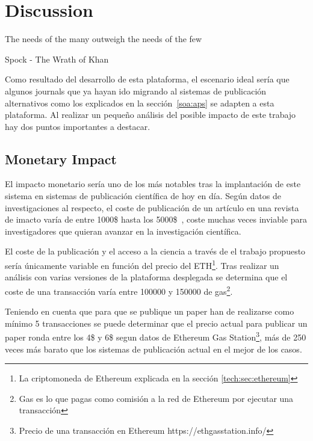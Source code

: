 \chapter{Discussion}

\begin{FraseCelebre}
  \begin{Frase}
    The needs of the many outweigh the needs of the few
  \end{Frase}
  \begin{Fuente}
    Spock - The Wrath of Khan
  \end{Fuente}
\end{FraseCelebre}

Como resultado del desarrollo de esta plataforma, el escenario ideal sería que
algunos journals que ya hayan ido migrando al sistemas de publicación
alternativos como los explicados en la sección~\ref{soa:aps} se adapten a esta
plataforma. Al realizar un pequeño análisis del posible impacto de este trabajo
hay dos puntos importantes a destacar.

\section{Monetary Impact}
El impacto monetario sería uno de los más notables tras la implantación de este
sistema en sistemas de publicación científica de hoy en día. Según datos de
investigaciones al respecto, el coste de publicación de un artículo en una
revista de imacto varía de entre 1000\$ hasta los
5000\$~\cite{van2013true,russel2008business}, coste muchas veces inviable para
investigadores que quieran avanzar en la investigación científica.

El coste de la publicación y el acceso a la ciencia a través de el trabajo
propuesto sería únicamente variable en función del precio del ETH\footnote{La
  criptomoneda de Ethereum explicada en la sección \ref{tech:sec:ethereum}}.
Tras realizar un análisis con varias versiones de la plataforma desplegada se
determina que el coste de una transacción varía entre 100000 y 150000 de
gas\footnote{Gas es lo que pagas como comisión a la red de Ethereum por ejecutar
  una transacción}.

Teniendo en cuenta que para que se publique un paper han de realizarse como
mínimo 5 transacciones se puede determinar que el precio actual para publicar un
paper ronda entre los 4\$ y 6\$ segun datos de Ethereum Gas
Station\footnote{Precio de una transacción en Ethereum
  https://ethgasstation.info/}, más de 250 veces más barato que los sistemas de
publicación actual en el mejor de los casos.


